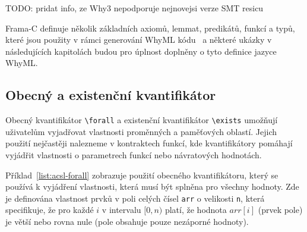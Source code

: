 TODO: pridat info, ze Why3 nepodporuje nejnovejsi verze SMT resicu



Frama\mbox{-}C definuje několik základních axiomů, lemmat, predikátů, funkcí a typů,
které jsou použity v rámci generování WhyML kódu~\cite{FCGitWhy} a
některé ukázky v následujících kapitolách budou pro úplnost doplněny o tyto definice jazyce WhyML\@.


\subsection{Obecný a existenční kvantifikátor}
\label{subsec:anotace-kvantifikatory}


Obecný kvantifikátor \texttt{\textbackslash forall} a existenční kvantifikátor \texttt{\textbackslash exists}
umožňují uživatelům vyjadřovat vlastnosti proměnných a paměťových oblastí.
Jejich použití nejčastěji nalezneme v kontraktech funkcí,
kde kvantifikátory pomáhají vyjádřit vlastnosti o parametrech funkcí nebo návratových hodnotách.


Příklad~\ref{list:acsl-forall} zobrazuje použití obecného kvantifikátoru,
který se používá k vyjádření vlastnosti, která musí být splněna pro všechny hodnoty.
Zde je definována vlastnost prvků v poli celých čísel \texttt{arr} o velikosti \texttt{n},
která specifikuje, že pro každé $i$ v intervalu $[0, n)$ platí,
že hodnota $arr[i]$ (prvek pole) je větší nebo rovna nule (pole obsahuje pouze nezáporné hodnoty).

